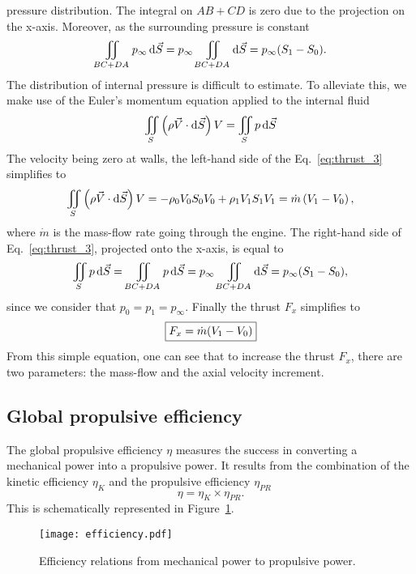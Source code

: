 pressure distribution. The integral on
$AB + CD$ is zero due to the projection on
the x-axis.
Moreover, as the surrounding pressure is constant
\begin{equation}
	\iint_{BC + DA} p_{\infty} \diff \vec{S} =
	p_{\infty} \iint_{BC + DA} \diff \vec{S} =
	p_{\infty} (S_{1} - S_{0}).
	\label{eq:thrust_2}
\end{equation}
The distribution of internal pressure is
difficult to estimate. To alleviate this, 
we make use of the Euler’s momentum 
equation applied to the internal fluid
\begin{equation}
	\iint_{S} \left(\rho \vec{V} \cdot \diff \vec{S} \right) V = 
	\iint_{S} p \diff \vec{S}
	\label{eq:thrust_3}
\end{equation}
The velocity being zero at walls, 
the left-hand side of the Eq.~\eqref{eq:thrust_3}
simplifies to
\begin{equation}
	\iint_{S} \left(\rho \vec{V} \cdot \mathop{}\!\mathrm{d} \vec{S} \right) V =
	- \rho_0 V_0 S_0 V_0 +  \rho_1 V_1 S_1 V_1 = 
	\dot{m} \left( V_{1} - V_{0} \right),
\end{equation}
where $\dot{m}$ is the mass-flow rate going through the engine.
The right-hand side of Eq.~\eqref{eq:thrust_3}, projected onto
the x-axis, is equal to 
\begin{equation}
	\iint_{S} p \mathop{}\!\mathrm{d} \vec{S} = 
	\iint_{BC + DA} p \mathop{}\!\mathrm{d} \vec{S} = 
	p_{\infty} \iint_{BC + DA} \mathop{}\!\mathrm{d} \vec{S} =
	p_{\infty} (S_{1} - S_{0}),
\end{equation}
since we consider that $p_0 = p_1 = p_\infty$.
Finally the thrust $F_x$ simplifies to
\begin{equation}
	\fbox{$
	F_x = \dot{m} (V_{1} - V_{0})
	$}
	\label{eq:cror_thrust}
\end{equation}
From this simple equation,
one can see that to increase the thrust $F_x$, there are two parameters:
the mass-flow and the axial velocity increment.

\subsection{Global propulsive efficiency}
\label{sub:cror_efficiency}

The global propulsive efficiency $\eta$ measures the 
success in converting a mechanical power into a
propulsive power. It results from the combination
of the kinetic efficiency $\eta_{K}$ and the propulsive efficiency
$\eta_{PR}$
\begin{equation}
	\eta = \eta_{K} \times \eta_{PR}.
\end{equation}
This is schematically represented in Figure~\ref{fig:cror_efficiency}.
\begin{figure}[htp]
  \centering
  \texttt{[image: efficiency.pdf]}
  \caption{Efficiency relations from mechanical power to propulsive power.}
  \label{fig:cror_efficiency}
\end{figure}

